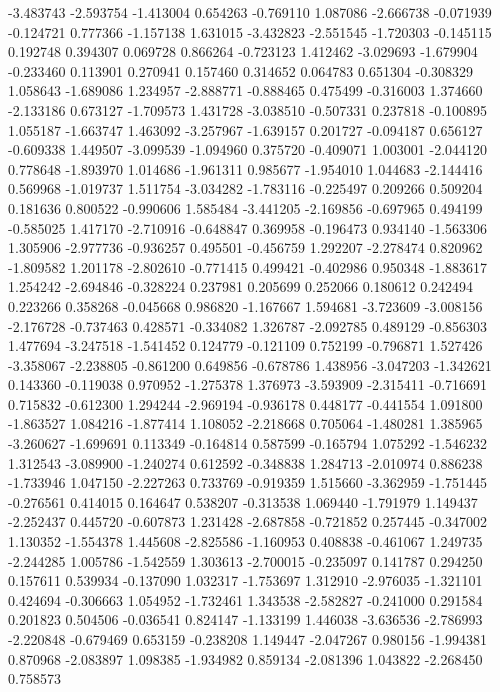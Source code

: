 -3.483743
-2.593754
-1.413004
0.654263
-0.769110
1.087086
-2.666738
-0.071939
-0.124721
0.777366
-1.157138
1.631015
-3.432823
-2.551545
-1.720303
-0.145115
0.192748
0.394307
0.069728
0.866264
-0.723123
1.412462
-3.029693
-1.679904
-0.233460
0.113901
0.270941
0.157460
0.314652
0.064783
0.651304
-0.308329
1.058643
-1.689086
1.234957
-2.888771
-0.888465
0.475499
-0.316003
1.374660
-2.133186
0.673127
-1.709573
1.431728
-3.038510
-0.507331
0.237818
-0.100895
1.055187
-1.663747
1.463092
-3.257967
-1.639157
0.201727
-0.094187
0.656127
-0.609338
1.449507
-3.099539
-1.094960
0.375720
-0.409071
1.003001
-2.044120
0.778648
-1.893970
1.014686
-1.961311
0.985677
-1.954010
1.044683
-2.144416
0.569968
-1.019737
1.511754
-3.034282
-1.783116
-0.225497
0.209266
0.509204
0.181636
0.800522
-0.990606
1.585484
-3.441205
-2.169856
-0.697965
0.494199
-0.585025
1.417170
-2.710916
-0.648847
0.369958
-0.196473
0.934140
-1.563306
1.305906
-2.977736
-0.936257
0.495501
-0.456759
1.292207
-2.278474
0.820962
-1.809582
1.201178
-2.802610
-0.771415
0.499421
-0.402986
0.950348
-1.883617
1.254242
-2.694846
-0.328224
0.237981
0.205699
0.252066
0.180612
0.242494
0.223266
0.358268
-0.045668
0.986820
-1.167667
1.594681
-3.723609
-3.008156
-2.176728
-0.737463
0.428571
-0.334082
1.326787
-2.092785
0.489129
-0.856303
1.477694
-3.247518
-1.541452
0.124779
-0.121109
0.752199
-0.796871
1.527426
-3.358067
-2.238805
-0.861200
0.649856
-0.678786
1.438956
-3.047203
-1.342621
0.143360
-0.119038
0.970952
-1.275378
1.376973
-3.593909
-2.315411
-0.716691
0.715832
-0.612300
1.294244
-2.969194
-0.936178
0.448177
-0.441554
1.091800
-1.863527
1.084216
-1.877414
1.108052
-2.218668
0.705064
-1.480281
1.385965
-3.260627
-1.699691
0.113349
-0.164814
0.587599
-0.165794
1.075292
-1.546232
1.312543
-3.089900
-1.240274
0.612592
-0.348838
1.284713
-2.010974
0.886238
-1.733946
1.047150
-2.227263
0.733769
-0.919359
1.515660
-3.362959
-1.751445
-0.276561
0.414015
0.164647
0.538207
-0.313538
1.069440
-1.791979
1.149437
-2.252437
0.445720
-0.607873
1.231428
-2.687858
-0.721852
0.257445
-0.347002
1.130352
-1.554378
1.445608
-2.825586
-1.160953
0.408838
-0.461067
1.249735
-2.244285
1.005786
-1.542559
1.303613
-2.700015
-0.235097
0.141787
0.294250
0.157611
0.539934
-0.137090
1.032317
-1.753697
1.312910
-2.976035
-1.321101
0.424694
-0.306663
1.054952
-1.732461
1.343538
-2.582827
-0.241000
0.291584
0.201823
0.504506
-0.036541
0.824147
-1.133199
1.446038
-3.636536
-2.786993
-2.220848
-0.679469
0.653159
-0.238208
1.149447
-2.047267
0.980156
-1.994381
0.870968
-2.083897
1.098385
-1.934982
0.859134
-2.081396
1.043822
-2.268450
0.758573
